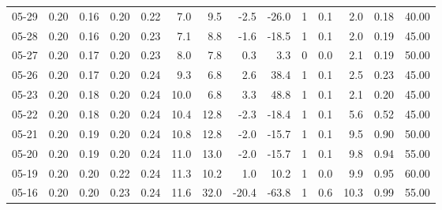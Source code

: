 \begin{threeparttable}
{\begin{tabular}{lrrrrrrrrrrrrr}
  05-29 &          0.20 &          0.16 &          0.20 &        0.22 &                 7.0 &                 9.5 &       -2.5 &        -26.0 &              1 &                 0.1 &              2.0 &            0.18 &                  40.00 \\
  05-28 &          0.20 &          0.16 &          0.20 &        0.23 &                 7.1 &                 8.8 &       -1.6 &        -18.5 &              1 &                 0.1 &              2.0 &            0.19 &                  45.00 \\
  05-27 &          0.20 &          0.17 &          0.20 &        0.23 &                 8.0 &                 7.8 &        0.3 &          3.3 &              0 &                 0.0 &              2.1 &            0.19 &                  50.00 \\
  05-26 &          0.20 &          0.17 &          0.20 &        0.24 &                 9.3 &                 6.8 &        2.6 &         38.4 &              1 &                 0.1 &              2.5 &            0.23 &                  45.00 \\
  05-23 &          0.20 &          0.18 &          0.20 &        0.24 &                10.0 &                 6.8 &        3.3 &         48.8 &              1 &                 0.1 &              2.1 &            0.20 &                  45.00 \\
  05-22 &          0.20 &          0.18 &          0.20 &        0.24 &                10.4 &                12.8 &       -2.3 &        -18.4 &              1 &                 0.1 &              5.6 &            0.52 &                  45.00 \\
  05-21 &          0.20 &          0.19 &          0.20 &        0.24 &                10.8 &                12.8 &       -2.0 &        -15.7 &              1 &                 0.1 &              9.5 &            0.90 &                  50.00 \\
  05-20 &          0.20 &          0.19 &          0.20 &        0.24 &                11.0 &                13.0 &       -2.0 &        -15.7 &              1 &                 0.1 &              9.8 &            0.94 &                  55.00 \\
  05-19 &          0.20 &          0.20 &          0.22 &        0.24 &                11.3 &                10.2 &        1.0 &         10.2 &              1 &                 0.0 &              9.9 &            0.95 &                  60.00 \\
  05-16 &          0.20 &          0.20 &          0.23 &        0.24 &                11.6 &                32.0 &      -20.4 &        -63.8 &              1 &                 0.6 &             10.3 &            0.99 &                  55.00 \\

\end{tabular}}
\end{threeparttable}
